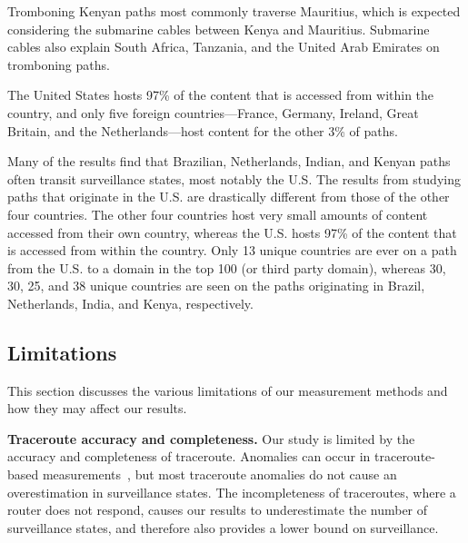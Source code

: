 Tromboning Kenyan paths most commonly traverse Mauritius, which is expected considering the submarine cables between Kenya and Mauritius.  Submarine cables also explain South Africa, Tanzania, and the United Arab Emirates on tromboning paths.  

\begin{finding}
The United States hosts 97\% of the content that is accessed from within the country, and only five foreign countries---France, Germany, Ireland, Great Britain, and the Netherlands---host content for the other 3\% of paths.
\end{finding}
\noindent
Many of the results find that Brazilian,
Netherlands, Indian, and Kenyan paths often transit surveillance states,
most notably the U.S.  The results from studying paths that
originate in the U.S. are drastically different from those of
the other four countries.  The other four countries host very small
amounts of content accessed from their own country, whereas the U.S.
hosts 97\% of the content that is accessed from within the
country.  Only 13 unique countries are ever on a path from the U.S.
to a domain in the top 100 (or third party domain), whereas 30,
30, 25, and 38 unique countries are seen on the paths originating in
Brazil, Netherlands, India, and Kenya, respectively.   


\subsection{Limitations}

This section discusses the various limitations of our measurement methods
and how they may affect our results.

\textbf{Traceroute accuracy and completeness.}
Our study is limited by the accuracy and completeness of traceroute.
Anomalies can occur in traceroute-based
measurements~\cite{augustin2006avoiding}, but most traceroute anomalies
do not cause an overestimation in surveillance states.  The
incompleteness of traceroutes, where a router does not respond, causes
our results to underestimate the number of surveillance states, and
therefore also provides a lower bound on surveillance. 


